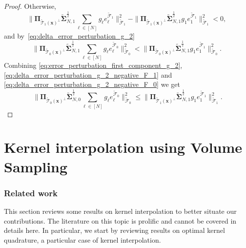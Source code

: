 \documentclass[twoside,11pt]{book}
\numberwithin{theorem}{chapter}
\numberwithin{definition}{chapter}
\numberwithin{proposition}{chapter}
\numberwithin{corollary}{chapter}
\numberwithin{example}{chapter}
\numberwithin{lemma}{chapter}
\newcommand{\rb}[1]{\textcolor{magenta}{#1}}
\begin{document}
\begin{proof}
Otherwise,  
\begin{equation}\label{eq:delta_error_perturbation_g_2_negative_F_1}
 \|\bm{\Pi}_{\tilde{\mathcal{T}}_{1}(\bm{x})^{\perp}} \tilde{\bm{\Sigma}}_{N,1}^{\frac{1}{2}} \sum\limits_{\ell \in [N]}g_{\ell} e_{\ell}^{\tilde{\mathcal{F}}_{1}}\|_{\tilde{\mathcal{F}}_{1}}^{2} - \|\bm{\Pi}_{\tilde{\mathcal{T}}_{1}(\bm{x})^{\perp}} \tilde{\bm{\Sigma}}_{N,1}^{\frac{1}{2}} g_{1} e_{1}^{\tilde{\mathcal{F}}_{1}}\|_{\tilde{\mathcal{F}}_{1}}^{2} < 0, 
\end{equation}
and by~\eqref{eq:delta_error_perturbation_g_2}
\begin{equation}\label{eq:delta_error_perturbation_g_2_negative_F_0}
\|\bm{\Pi}_{\tilde{\mathcal{T}}_{0}(\bm{x})^{\perp}} \tilde{\bm{\Sigma}}_{N,1}^{\frac{1}{2}} \sum\limits_{\ell \in [N]}g_{\ell} e_{\ell}^{\tilde{\mathcal{F}}_{0}}\|_{\tilde{\mathcal{F}}_{0}}^{2} < \|\bm{\Pi}_{\tilde{\mathcal{T}}_{0}(\bm{x})^{\perp}} \tilde{\bm{\Sigma}}_{N,1}^{\frac{1}{2}} g_{1} e_{1}^{\tilde{\mathcal{F}}_{1}}\|_{\tilde{\mathcal{F}}_{0}}^{2}.
\end{equation}
Combining \eqref{eq:error_perturbation_first_component_g_2}, \eqref{eq:delta_error_perturbation_g_2_negative_F_1} and \eqref{eq:delta_error_perturbation_g_2_negative_F_0} 
we get
\begin{equation}
\:\|\bm{\Pi}_{\tilde{\mathcal{T}}_{0}(\bm{x})^{\perp}} \tilde{\bm{\Sigma}}_{N,0}^{\frac{1}{2}} \sum\limits_{\ell \in [N]}g_{\ell} e_{\ell}^{\tilde{\mathcal{F}}_{0}}\|_{\tilde{\mathcal{F}}_{0}}^{2} \leq \|\bm{\Pi}_{\tilde{\mathcal{T}}_{1}(\bm{x})^{\perp}} \tilde{\bm{\Sigma}}_{N,1}^{\frac{1}{2}} g_{1} e_{1}^{\tilde{\mathcal{F}}_{1}}\|_{\tilde{\mathcal{F}}_{1}}^{2}.
\end{equation}
\end{proof}


\clearpage

\chapter{Kernel interpolation using Volume Sampling}

\subsection{Related work}\label{s:relatedWork}
This section reviews some results on kernel interpolation to better situate our contributions. The literature on this topic is prolific and cannot be covered in details here. In particular, we start by reviewing results on optimal kernel quadrature, a particular case of kernel interpolation.
\end{document}
